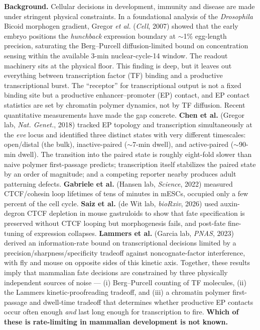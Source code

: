\documentclass[11pt]{article}
\begin{document}
\textbf{Background.} Cellular decisions in development, immunity and
disease are made under stringent physical constraints. In a foundational
analysis of the \textit{Drosophila} Bicoid morphogen gradient, Gregor
\textit{et al.} (\textit{Cell}, 2007) showed that the early embryo
positions the \textit{hunchback} expression boundary at $\sim$1\%
egg-length precision, saturating the Berg--Purcell diffusion-limited bound
on concentration sensing within the available 3-min nuclear-cycle-14
window. The readout machinery sits at the physical floor. This finding is
deep, but it leaves out everything between transcription factor (TF)
binding and a productive transcriptional burst. The ``receptor'' for
transcriptional output is not a fixed binding site but a productive
enhancer--promoter (EP) contact, and EP contact statistics are set by
chromatin polymer dynamics, not by TF diffusion. Recent quantitative
measurements have made the gap concrete. \textbf{Chen et al.} (Gregor
lab, \textit{Nat. Genet.}, 2018) tracked EP topology and transcription
simultaneously at the \textit{eve} locus and identified three distinct
states with very different timescales: open/distal (the bulk),
inactive-paired ($\sim$7-min dwell), and active-paired ($\sim$90-min
dwell). The transition into the paired state is roughly eight-fold slower
than naive polymer first-passage predicts; transcription itself stabilizes
the paired state by an order of magnitude; and a competing reporter
nearby produces adult patterning defects. \textbf{Gabriele et al.}
(Hansen lab, \textit{Science}, 2022) measured CTCF/cohesin loop lifetimes
of tens of minutes in mESCs, occupied only a few percent of the cell
cycle. \textbf{Saiz et al.} (de Wit lab, \textit{bioRxiv}, 2026) used
auxin-degron CTCF depletion in mouse gastruloids to show that fate
specification is preserved without CTCF looping but morphogenesis fails,
and post-fate fine-tuning of expression collapses. \textbf{Lammers et
al.} (Garcia lab, \textit{PNAS}, 2023) derived an information-rate bound
on transcriptional decisions limited by a precision/sharpness/specificity
tradeoff against noncognate-factor interference, with fly and mouse on
opposite sides of this kinetic axis. Together, these results imply that
mammalian fate decisions are constrained by three physically independent
sources of noise --- (i) Berg--Purcell counting of TF molecules,
(ii) the Lammers kinetic-proofreading tradeoff, and (iii) a chromatin
polymer first-passage and dwell-time tradeoff that determines whether
productive EP contacts occur often enough \emph{and} last long enough for
transcription to fire. \textbf{Which of these is rate-limiting in
mammalian development is not known.}
\end{document}
